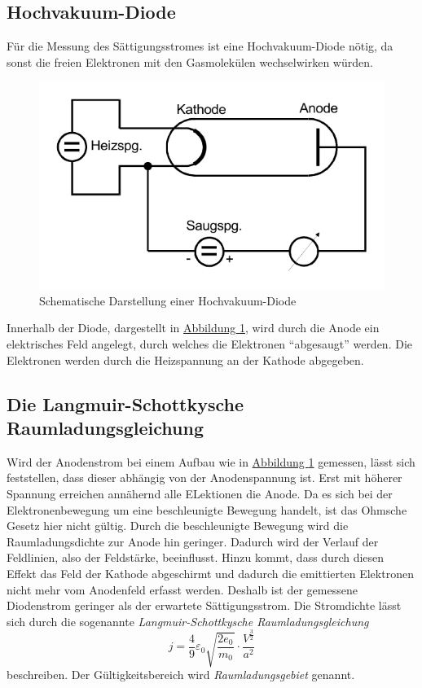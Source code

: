 \subsection{Hochvakuum-Diode}

Für die Messung des Sättigungsstromes ist eine Hochvakuum-Diode nötig, da sonst die freien Elektronen mit den Gasmolekülen wechselwirken würden.
\begin{figure}[H]
    \centering
    \includegraphics[width=0.6\linewidth]{pictures/Diode.pdf}
    \caption{Schematische Darstellung einer Hochvakuum-Diode}
    \label{fig:Diode}
\end{figure}

Innerhalb der Diode, dargestellt in \hyperref[fig:Diode]{Abbildung \ref{fig:Diode}}, wird durch die Anode ein elektrisches Feld angelegt, durch welches die Elektronen \enquote{abgesaugt} werden.
Die Elektronen werden durch die Heizspannung an der Kathode abgegeben.


\subsection{Die Langmuir-Schottkysche Raumladungsgleichung}\label{eq:Langmuir}

Wird der Anodenstrom bei einem Aufbau wie in \hyperref[fig:Diode]{Abbildung \ref{fig:Diode}} gemessen, lässt sich feststellen,
dass dieser abhängig von der Anodenspannung ist.
Erst mit höherer Spannung erreichen annähernd alle ELektionen die Anode.
Da es sich bei der Elektronenbewegung um eine beschleunigte Bewegung handelt, ist das Ohmsche Gesetz hier nicht gültig.
Durch die beschleunigte Bewegung wird die Raumladungsdichte zur Anode hin geringer.
Dadurch wird der Verlauf der Feldlinien, also der Feldstärke, beeinflusst.
Hinzu kommt, dass durch diesen Effekt das Feld der Kathode abgeschirmt und dadurch die emittierten
Elektronen nicht mehr vom Anodenfeld erfasst werden.
Deshalb ist der gemessene Diodenstrom geringer als der erwartete Sättigungsstrom.
Die Stromdichte lässt sich durch die sogenannte \textit{Langmuir-Schottkysche Raumladungsgleichung} 
\begin{equation}\label{eq:lsr}
    j=\frac{4}{9} \varepsilon_{0} \sqrt{\frac{2 e_{0} }{ m_{0}}} \cdot \frac{V^{\frac{3}{2}}}{a^{2}}
\end{equation}
beschreiben. Der Gültigkeitsbereich wird \textit{Raumladungsgebiet} genannt.



